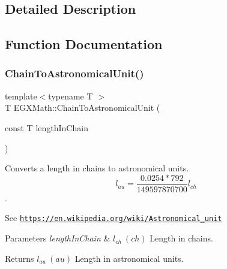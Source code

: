 \subsection{Detailed Description}


\subsection{Function Documentation}
\mbox{\label{group___e_g_x_math-_conversions-_length_conversions-_imperial-_chain-_astronomical_ga5fd3b01f376172581a8847b593d33466}} 
\subsubsection{\texorpdfstring{Chain\+To\+Astronomical\+Unit()}{ChainToAstronomicalUnit()}}
{\footnotesize\ttfamily template$<$typename T $>$ \\
T E\+G\+X\+Math\+::\+Chain\+To\+Astronomical\+Unit (\begin{DoxyParamCaption}\item[{const T}]{length\+In\+Chain }\end{DoxyParamCaption})}



Converts a length in chains to astronomical units. \[ l_{au}=\frac{0.0254 * 792}{149597870700} l_{ch} \]. 

See \href{https://en.wikipedia.org/wiki/Astronomical_unit}{\tt https\+://en.\+wikipedia.\+org/wiki/\+Astronomical\+\_\+unit} 
\begin{DoxyParams}{Parameters}
{\em length\+In\+Chain} & $ l_{ch}\ (ch)$ Length in chains. \\
\hline
\end{DoxyParams}
\begin{DoxyReturn}{Returns}
$ l_{au}\ (au)$ Length in astronomical units. 
\end{DoxyReturn}
\mbox{\label{group___e_g_x_math-_conversions-_length_conversions-_imperial-_chain-_astronomical_ga0414df8660b7f8fd74f32b0d88c3476f}} 

